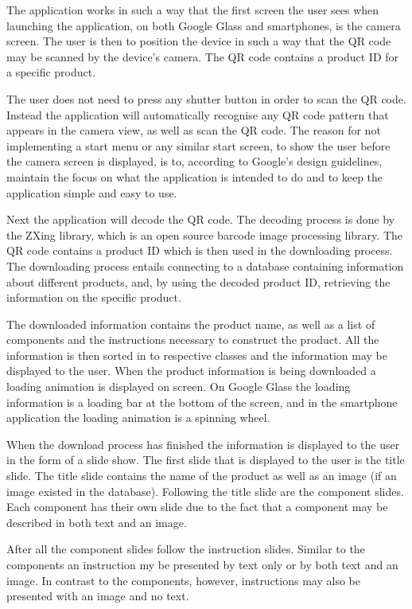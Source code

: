 The application works in such a way that the first screen the user sees when launching the application, on both Google Glass and smartphones, is the camera screen. The user is then to position the device in such a way that the QR code may be scanned by the device's camera. The QR code contains a product ID for a specific product.

The user does not need to press any shutter button in order to scan the QR code. Instead the application will automatically recognise any QR code pattern that appears in the camera view, as well as scan the QR code. The reason for not implementing a start menu or any similar start screen, to show the user before the camera screen is displayed, is to, according to Google's design guidelines, maintain the focus on what the application is intended to do and to keep the application simple and easy to use.

Next the application will decode the QR code. The decoding process is done by the ZXing library, which is an open source  barcode image processing library. The QR code contains a product ID which is then used in the downloading process. The downloading process entails connecting to a database containing information about different products, and, by using the decoded product ID, retrieving the information on the specific product. 

The downloaded information contains the product name, as well as a list of components and the instructions necessary to construct the product. All the information is then sorted in to respective classes and the information may be displayed to the user. When the product information is being downloaded a loading animation is displayed on screen. On Google Glass the loading information is a loading bar at the bottom of the screen, and in the smartphone application the loading animation is a spinning wheel.

When the download process has finished the information is displayed to the user in the form of a slide show. The first slide that is displayed to the user is the title slide. The title slide contains the name of the product as well as an image  (if an image existed in the database). Following the title slide are the component slides. Each component has their own slide due to the fact that a component may be described in both text and an image. 

After all the component slides follow the instruction slides. Similar to the components an instruction my be presented by text only or by both text and an image. In contrast to the components, however, instructions may also be presented with an image and no text. 

